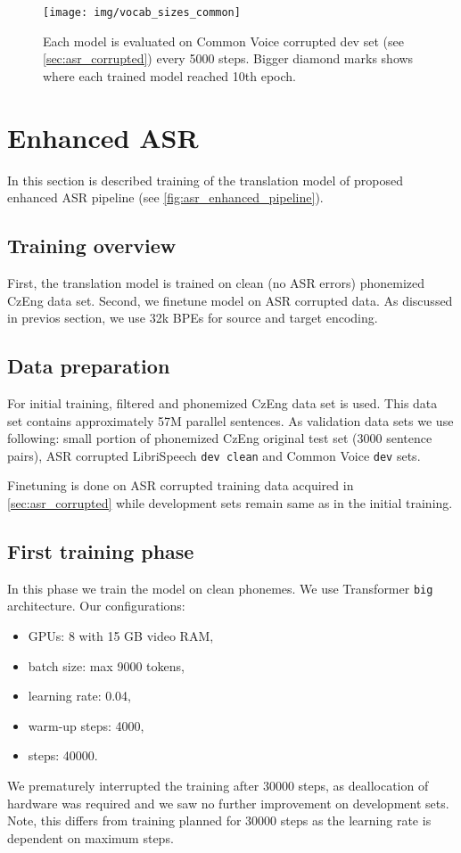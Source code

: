 \begin{figure*}[h]
	\texttt{[image: img/vocab\_sizes\_common]}
	\caption{Each model is evaluated on Common Voice corrupted dev set (see \cref{sec:asr_corrupted}) every 5000 steps. Bigger diamond marks shows where each trained model reached 10th epoch.}
	\label{fig:vocab_sizes_common}
\end{figure*}

\section{Enhanced ASR}
In this section is described training of the translation model of proposed enhanced ASR pipeline (see \cref{fig:asr_enhanced_pipeline}).

\subsection{Training overview}
First, the translation model is trained on clean (no ASR errors) phonemized CzEng data set. Second, we finetune model on ASR corrupted data. As discussed in previos section, we use 32k BPEs for source and target encoding.

\subsection{Data preparation}
For initial training, filtered and phonemized CzEng data set is used. This data set contains approximately 57M parallel sentences. As validation data sets we use following: small portion of phonemized CzEng original test set (3000 sentence pairs), ASR corrupted LibriSpeech \texttt{dev clean} and Common Voice \texttt{dev} sets.

Finetuning is done on ASR corrupted training data acquired in \cref{sec:asr_corrupted} while development sets remain same as in the initial training.

\subsection{First training phase}
In this phase we train the model on clean phonemes. We use Transformer \texttt{big} architecture.
Our configurations:

\begin{itemize}
    \item GPUs: 8 with 15 GB video RAM,
    \item batch size: max 9000 tokens,
    \item learning rate: 0.04,
    \item warm-up steps: 4000,
    \item steps: 40000.
\end{itemize}

We prematurely interrupted the training after 30000 steps, as deallocation of hardware was required and we saw no further improvement on development sets. Note, this differs from training planned for 30000 steps as the learning rate is dependent on maximum steps.

